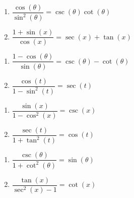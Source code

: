 \begin{multicols}{2}

\begin{enumerate}

\setcounter{enumi}{\value{HW}}

\item $\dfrac{\cos(\theta)}{\sin^{2}(\theta)} = \csc(\theta) \cot(\theta)$
\item $\dfrac{1+ \sin(x)}{\cos(x)} = \sec(x) + \tan(x)$

\setcounter{HW}{\value{enumi}}

\end{enumerate}

\end{multicols}

\begin{multicols}{2}

\begin{enumerate}

\setcounter{enumi}{\value{HW}}

\item $\dfrac{1 - \cos(\theta)}{\sin(\theta)} = \csc(\theta) - \cot(\theta)$
\item  $\dfrac{\cos(t)}{1 - \sin^{2}(t)} = \sec(t)$

\setcounter{HW}{\value{enumi}}

\end{enumerate}

\end{multicols}

\begin{multicols}{2}

\begin{enumerate}

\setcounter{enumi}{\value{HW}}

\item  $\dfrac{\sin(x)}{1 - \cos^{2}(x)} = \csc(x)$
\item  $\dfrac{\sec(t)}{1 + \tan^{2}(t)} = \cos(t)$

\setcounter{HW}{\value{enumi}}

\end{enumerate}

\end{multicols}

\begin{multicols}{2}

\begin{enumerate}

\setcounter{enumi}{\value{HW}}

\item  $\dfrac{\csc(\theta)}{1 + \cot^{2}(\theta)} = \sin(\theta)$
\item   $\dfrac{\tan(x)}{\sec^{2}(x) - 1} = \cot(x)$

\setcounter{HW}{\value{enumi}}

\end{enumerate}

\end{multicols}

